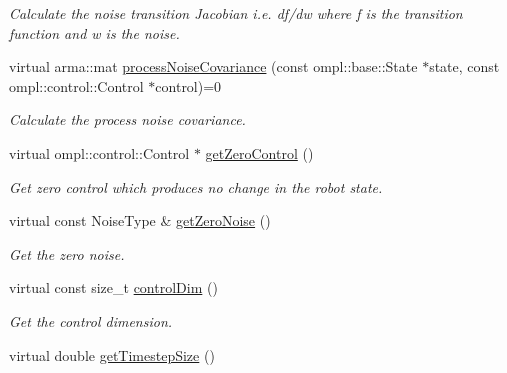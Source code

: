 \begin{DoxyCompactItemize}
\begin{DoxyCompactList}\small\item\em \-Calculate the noise transition \-Jacobian i.\-e. df/dw where f is the transition function and w is the noise. \end{DoxyCompactList}\item 
\hypertarget{class_motion_model_method_a559dc48932d5aca3215e3f24e29680ce}{virtual arma\-::mat \hyperlink{class_motion_model_method_a559dc48932d5aca3215e3f24e29680ce}{process\-Noise\-Covariance} (const ompl\-::base\-::\-State $\ast$state, const ompl\-::control\-::\-Control $\ast$control)=0}\label{class_motion_model_method_a559dc48932d5aca3215e3f24e29680ce}

\begin{DoxyCompactList}\small\item\em \-Calculate the process noise covariance. \end{DoxyCompactList}\item 
\hypertarget{class_motion_model_method_a4002e8e3bb3af13d56bc162b655a1543}{virtual ompl\-::control\-::\-Control $\ast$ \hyperlink{class_motion_model_method_a4002e8e3bb3af13d56bc162b655a1543}{get\-Zero\-Control} ()}\label{class_motion_model_method_a4002e8e3bb3af13d56bc162b655a1543}

\begin{DoxyCompactList}\small\item\em \-Get zero control which produces no change in the robot state. \end{DoxyCompactList}\item 
\hypertarget{class_motion_model_method_a56d9a853b4ec8158c4c9016614c86a9f}{virtual const \-Noise\-Type \& \hyperlink{class_motion_model_method_a56d9a853b4ec8158c4c9016614c86a9f}{get\-Zero\-Noise} ()}\label{class_motion_model_method_a56d9a853b4ec8158c4c9016614c86a9f}

\begin{DoxyCompactList}\small\item\em \-Get the zero noise. \end{DoxyCompactList}\item 
\hypertarget{class_motion_model_method_ad0012e93feba030fa8e9a47a18c6ff0e}{virtual const size\-\_\-t \hyperlink{class_motion_model_method_ad0012e93feba030fa8e9a47a18c6ff0e}{control\-Dim} ()}\label{class_motion_model_method_ad0012e93feba030fa8e9a47a18c6ff0e}

\begin{DoxyCompactList}\small\item\em \-Get the control dimension. \end{DoxyCompactList}\item 
\hypertarget{class_motion_model_method_a86ef6178a4d438fde83f1c3f110ad2b4}{virtual double \hyperlink{class_motion_model_method_a86ef6178a4d438fde83f1c3f110ad2b4}{get\-Timestep\-Size} ()}\label{class_motion_model_method_a86ef6178a4d438fde83f1c3f110ad2b4}


\end{DoxyCompactItemize}
